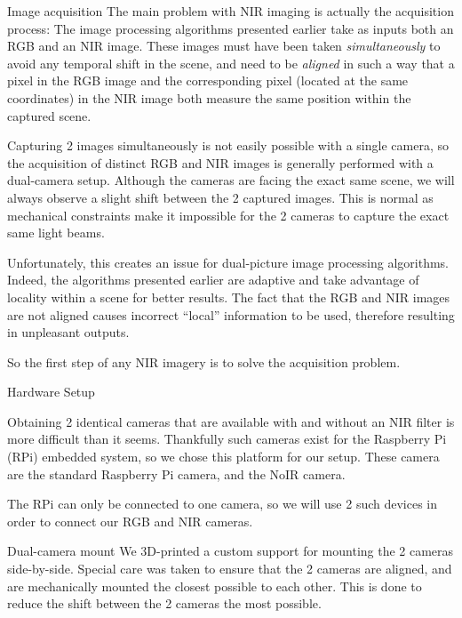 \documentclass[11pt]{article}
\begin{document}
\begin{section}{Image acquisition}
    The main problem with NIR imaging is actually the acquisition process:
    The image processing algorithms presented earlier take as inputs both an RGB and an NIR image. These images must have been taken \emph{simultaneously} to avoid any temporal shift in the scene, and need to be \emph{aligned} in such a way that a pixel in the RGB image and the corresponding pixel (located at the same coordinates) in the NIR image both measure the same position within the captured scene.

    \medskip

    Capturing 2 images simultaneously is not easily possible with a single camera, so the acquisition of distinct RGB and NIR images is generally performed with a dual-camera setup. Although the cameras are facing the exact same scene, we will always observe a slight shift between the 2 captured images. This is normal as mechanical constraints make it impossible for the 2 cameras to capture the exact same light beams.

    \medskip

    Unfortunately, this creates an issue for dual-picture image processing algorithms. Indeed, the algorithms presented earlier are adaptive and take advantage of locality within a scene for better results. The fact that the RGB and NIR images are not aligned causes incorrect ``local'' information to be used, therefore resulting in unpleasant outputs.

    \medskip

    So the first step of any NIR imagery is to solve the acquisition problem.

    \begin{subsection}{Hardware Setup}
        \label{sec:hardware}

        Obtaining 2 identical cameras that are available with and without an NIR filter is more difficult than it seems. Thankfully such cameras exist for the Raspberry Pi (RPi) embedded system, so we chose this platform for our setup. These camera are the standard Raspberry Pi camera, and the NoIR camera.

        \medskip

        The RPi can only be connected to one camera, so we will use 2 such devices in order to connect our RGB and NIR cameras.

        \begin{subsubsection}{Dual-camera mount}
            We 3D-printed a custom support for mounting the 2 cameras side-by-side. Special care was taken to ensure that the 2 cameras are aligned, and are mechanically mounted the closest possible to each other. This is done to reduce the shift between the 2 cameras the most possible.


\end{subsubsection}
\end{subsection}
\end{section}
\end{document}
